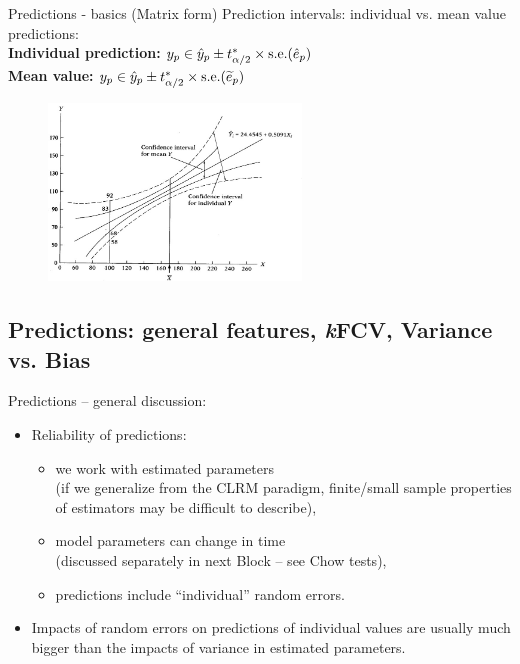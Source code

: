 \documentclass{beamer}
\begin{document}
\begin{frame}{Predictions - basics (Matrix form)}
Prediction intervals: individual vs. mean value predictions:\\
\vspace{0.3cm}
\textbf{Individual prediction:} $y_p \in \hat{y}_p \pm t^*_{\alpha/2} \times \textnormal{s.e.}(\hat{e}_p)$\\
\vspace{0.3cm}
\textbf{Mean value:} \hspace{1.7cm} $y_p \in \hat{y}_p \pm t^*_{\alpha/2} \times \textnormal{s.e.}(\widetilde{e}_p)$

\begin{figure}
\includegraphics[width=0.6\textwidth]{img/P3_PredError.jpg}
\end{figure}

\end{frame}

\subsection{Predictions: general features, \textit{k}FCV, Variance vs. Bias}
\begin{frame}{Predictions -- general discussion:}
\begin{itemize}
\item Reliability of predictions: \\ \bigskip

\begin{itemize}

\item we work with estimated parameters \\(if we generalize from the CLRM paradigm, finite/small sample properties of estimators may be difficult to describe),
\medskip
\item model parameters can change in time \\(discussed separately in next Block -- see Chow tests),
\medskip
\item predictions include ``individual'' random errors.
\end{itemize}
\vspace{0.3cm}
\item Impacts of random errors on predictions of individual values are usually much bigger than the impacts of variance in estimated parameters.
\end{itemize}
\end{frame}
\end{document}
